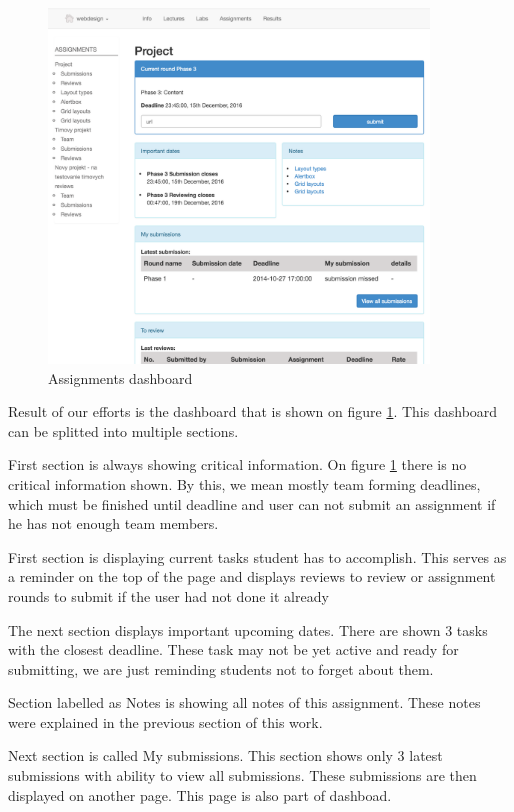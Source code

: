\begin{figure}[h]
    \centering
    \includegraphics[width=0.9\textwidth]{images/dashboard.png}
    \caption{Assignments dashboard}
    \label{fig:assignments_dashboard}
\end{figure}

Result of our efforts is the dashboard that is shown on figure \ref{fig:assignments_dashboard}. This dashboard can be splitted into multiple sections.

First section is always showing critical information. On figure \ref{fig:assignments_dashboard} there is no critical information shown. By this, we mean mostly team forming deadlines, which must be finished until deadline and user can not submit an assignment if he has not enough team members.

First section is displaying current tasks student has to accomplish. This serves as a reminder on the top of the page and displays reviews to review or assignment rounds to submit if the user had not done it already

The next section displays important upcoming dates. There are shown 3 tasks with the closest deadline. These task may not be yet active and ready for submitting, we are just reminding students not to forget about them. 

Section labelled as Notes is showing all notes of this assignment. These notes were explained in the previous section of this work.

Next section is called My submissions. This section shows only 3 latest submissions with ability to view all submissions. These submissions are then displayed on another page. This page is also part of dashboad.

